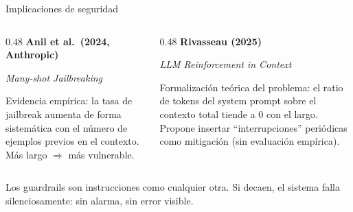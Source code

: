 \documentclass[aspectratio=169, 11pt]{beamer}
\begin{document}
\begin{frame}{Implicaciones de seguridad}

\begin{columns}[T]
\begin{column}{0.48\textwidth}
\textbf{Anil et al.\ (2024, Anthropic)}

\vspace{0.3em}
\footnotesize
\textit{Many-shot Jailbreaking}

\vspace{0.5em}

Evidencia emp\'irica: la tasa de jailbreak aumenta de forma sistem\'atica con el n\'umero de ejemplos previos en el contexto. M\'as largo $\Rightarrow$ m\'as vulnerable.
\end{column}

\begin{column}{0.48\textwidth}
\textbf{Rivasseau (2025)}

\vspace{0.3em}
\footnotesize
\textit{LLM Reinforcement in Context}

\vspace{0.5em}

Formalizaci\'on te\'orica del problema: el ratio de tokens del system prompt sobre el contexto total tiende a 0 con el largo. Propone insertar ``interrupciones'' peri\'odicas como mitigaci\'on (sin evaluaci\'on emp\'irica).
\end{column}
\end{columns}

\vspace{0.8em}

\begin{alertblock}{}
\footnotesize
Los guardrails son instrucciones como cualquier otra. Si decaen, el sistema falla silenciosamente: sin alarma, sin error visible.
\end{alertblock}

\end{frame}

\end{document}
